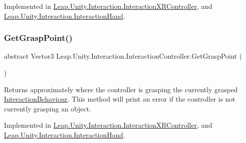 Implemented in \mbox{\hyperlink{class_leap_1_1_unity_1_1_interaction_1_1_interaction_x_r_controller_a6870022c14d8cea42d36502b7a0a299f}{Leap.\+Unity.\+Interaction.\+Interaction\+X\+R\+Controller}}, and \mbox{\hyperlink{class_leap_1_1_unity_1_1_interaction_1_1_interaction_hand_a760d127098bcd961aa2ede7c279faa9c}{Leap.\+Unity.\+Interaction.\+Interaction\+Hand}}.

\mbox{\label{class_leap_1_1_unity_1_1_interaction_1_1_interaction_controller_aca84a24dd5f2f73a7c8bee6a15cea0a4}} 
\subsubsection{\texorpdfstring{GetGraspPoint()}{GetGraspPoint()}}
{\footnotesize\ttfamily abstract Vector3 Leap.\+Unity.\+Interaction.\+Interaction\+Controller.\+Get\+Grasp\+Point (\begin{DoxyParamCaption}{ }\end{DoxyParamCaption})\hspace{0.3cm}{\ttfamily [pure virtual]}}



Returns approximately where the controller is grasping the currently grasped \mbox{\hyperlink{class_leap_1_1_unity_1_1_interaction_1_1_interaction_behaviour}{Interaction\+Behaviour}}. This method will print an error if the controller is not currently grasping an object. 



Implemented in \mbox{\hyperlink{class_leap_1_1_unity_1_1_interaction_1_1_interaction_x_r_controller_acf5f67ce22587c6d638890d9af2ecadb}{Leap.\+Unity.\+Interaction.\+Interaction\+X\+R\+Controller}}, and \mbox{\hyperlink{class_leap_1_1_unity_1_1_interaction_1_1_interaction_hand_ad3db830a66914a000a05003b36b4596d}{Leap.\+Unity.\+Interaction.\+Interaction\+Hand}}.

\mbox{\label{class_leap_1_1_unity_1_1_interaction_1_1_interaction_controller_a78d837eccab12304e8c02b79fda189d1}} 
